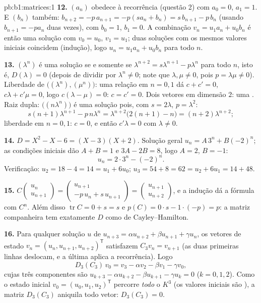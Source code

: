 \begin{solution}{pb:b1:matrices:1}
\textbf{12.} $(a_n)$ obedece à recorrência (questão 2) com $a_0 =
0$, $a_1 = 1$. E $(b_n)$ também: $b_{n+2} = -p\,a_{n+1} =
-p(s a_n + b_n) = s\,b_{n+1} - p\,b_n$ (usando $b_{n+1} = -pa_n$ duas vezes),
com $b_0 = 1$, $b_1 = 0$. A combinação $v_n =
u_1 a_n + u_0 b_n$ é então uma solução com
$v_0 = u_0$, $v_1 =
u_1$; duas soluções com os mesmos valores iniciais coincidem
(indução), logo $u_n = u_1 a_n + u_0 b_n$ para todo $n$.

\textbf{13.} $(\lambda^n)$ é uma solução se e somente se $\lambda^{n+2} =
s\lambda^{n+1} - p\lambda^n$ para todo
$n$, isto é, $D(\lambda) = 0$ (depois de dividir por $\lambda^n \neq 0$; note que $\lambda, \mu \neq
0$,
pois $p = \lambda\mu \neq 0$). Liberdade de $\bigl((\lambda^n), (\mu^n)\bigr)$: uma relação em $n = 0, 1$ dá $c + c' = 0$,
$c\lambda + c'\mu = 0$, logo $c(\lambda - \mu)
= 0$: $c = c' = 0$. Dois vetores  em dimensão $2$: uma
. Raiz dupla: $\bigl((n\lambda^n)\bigr)$ é uma solução pois, com $s = 2\lambda$, $p = \lambda^2$:
\[
s(n+1)\lambda^{n+1} - p\,n\lambda^n
= \lambda^{n+2}\bigl(2(n+1) - n\bigr) = (n+2)\lambda^{n+2} ;
\]
liberdade em $n = 0, 1$: $c = 0$, e então $c'\lambda = 0$ com $\lambda \neq 0$.

\textbf{14.} $D = X^2 - X - 6 = (X - 3)(X + 2)$. Solução geral $u_n = A\,3^n + B(-2)^n$; as condições iniciais dão
$A + B = 1$ e $3A - 2B = 8$, logo $A = 2$, $B = -1$:
\[
u_n = 2\cdot 3^n - (-2)^n .
\]
Verificação: $u_2 = 18 - 4 = 14 = u_1 + 6u_0$; $u_3 = 54 + 8 = 62 =
u_2 + 6u_1 = 14 + 48$.

\textbf{15.} $C\begin{pmatrix} u_n\\ u_{n+1}\end{pmatrix} =
\begin{pmatrix} u_{n+1}\\ -p\,u_n + s\,u_{n+1}\end{pmatrix} =
\begin{pmatrix} u_{n+1}\\ u_{n+2}\end{pmatrix}$, e a indução dá a fórmula com $C^n$. Além disso
$\operatorname{tr} C = 0
+ s = s$ e $p(C) = 0\cdot s - 1\cdot(-p) = p$: a matriz companheira tem exatamente $D$ como
 de Cayley--Hamilton.

\textbf{16.} Para qualquer solução $u$ de $u_{n+3} = \alpha u_{n+2} +
\beta u_{n+1} + \gamma u_n$, os vetores de
estado $v_n = (u_n,
u_{n+1}, u_{n+2})^{\mathsf T}$ satisfazem $C_3 v_n = v_{n+1}$ (as duas primeiras linhas deslocam, e
a última aplica a recorrência). Logo
\[
D_3(C_3)\,v_0 = v_3 - \alpha v_2 - \beta v_1 - \gamma v_0 ,
\]
cujas três componentes são $u_{k+3} - \alpha u_{k+2} - \beta
u_{k+1} - \gamma u_k = 0$ ($k = 0, 1, 2$). Como o estado inicial
$v_0 = (u_0, u_1, u_2)^{\mathsf T}$ percorre \emph{todo} o $K^3$ (os valores iniciais são ),
a matriz $D_3(C_3)$ aniquila todo vetor: $D_3(C_3) = 0$.


\end{solution}
